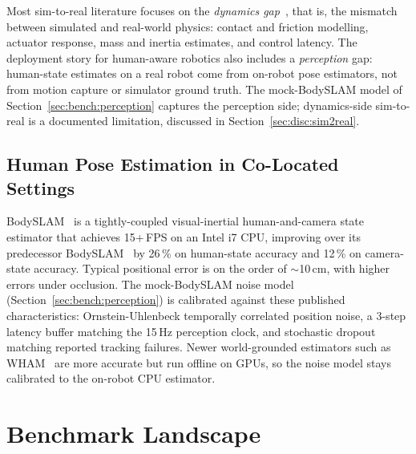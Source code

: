 \documentclass[11pt,a4paper]{report}
\newcommand{\bodyslampp}{BodySLAM\nolinebreak[4]\hspace{-.05em}\raisebox{.2ex}{\scriptsize ++}}
\begin{document}
Most sim-to-real literature focuses on the \emph{dynamics
gap}~\cite{tobin2017domainrand,muratore2022randomized},
that is, the
mismatch between simulated and real-world physics: contact and
friction modelling, actuator response, mass and inertia estimates,
and control latency. The deployment
story for human-aware robotics also includes a \emph{perception}
gap: human-state estimates on a real robot come from on-robot pose
estimators, not from motion capture or simulator ground truth. The
mock-\bodyslampp{} model of Section~\ref{sec:bench:perception}
captures the perception side; dynamics-side sim-to-real is a
documented limitation, discussed in Section~\ref{sec:disc:sim2real}.

\subsection{Human Pose Estimation in Co-Located Settings}
\label{sec:bg:sim2real:pose}

\bodyslampp{}~\cite{henning2023bodyslampp} is a tightly-coupled
visual-inertial human-and-camera state estimator that achieves
15+\,FPS on an Intel i7 CPU, improving over its predecessor
BodySLAM~\cite{henning2022bodyslam} by 26\,\% on human-state
accuracy and 12\,\% on camera-state accuracy. Typical positional
error is on the order of $\sim$10\,cm, with higher errors under
occlusion. The mock-\bodyslampp{} noise model
(Section~\ref{sec:bench:perception}) is calibrated against these
published characteristics: Ornstein-Uhlenbeck temporally correlated
position noise, a 3-step latency buffer matching the 15\,Hz
perception clock, and stochastic dropout matching reported tracking
failures. Newer world-grounded estimators such as
WHAM~\cite{shin2024wham} are more accurate but run offline on GPUs,
so the noise model stays calibrated to the on-robot CPU estimator.

\section{Benchmark Landscape}
\label{sec:bg:bench}
\end{document}
